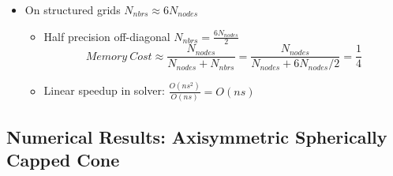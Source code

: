 \documentclass{beamer}
\begin{document}
\begin{frame}
\begin{columns}[t]
  \end{columns}
  \begin{itemize}
    \item On structured grids $N_{nbrs} \approx 6 N_{nodes}$
    \begin{itemize}
      \item Half precision off-diagonal $N_{nbrs} = \frac{6N_{nodes}}{2}$
        \[ 
          Memory\ Cost \approx 
           \frac{N_{nodes}}{N_{nodes} + N_{nbrs}} =
           \frac{N_{nodes}}{N_{nodes} + 6N_{nodes}/2} = \frac{1}{4}
        \]
      \item Linear speedup in solver: $\frac{O(ns^2)}{O(ns)} = O(ns)$
    \end{itemize}
  \end{itemize}
\end{frame}

\subsection{Numerical Results: Axisymmetric Spherically Capped Cone}
\end{document}
